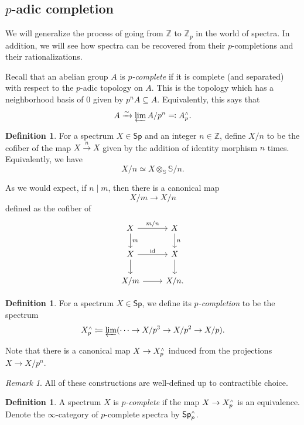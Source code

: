 \documentclass[10pt, oneside]{memoir}
\theoremstyle{definition}
\newtheorem{defn}[thm]{Definition}
\theoremstyle{remark}
\newtheorem{rmk}[thm]{Remark}
\theoremstyle{plain}
\theoremstyle{definition}
\theoremstyle{remark}
\newcommand{\Z}{\mathbb{Z}}
\newcommand{\bS}{\mathbb{S}}
\newcommand{\mr}[1]{\mathrm{#1}}
\newcommand{\ms}[1]{\mathsf{#1}}
\newcommand{\1}{\mathbf{1}}
\newcommand{\2}{\mathbf{2}}
\newcommand{\3}{\mathbf{3}}
\newcommand{\sw}{\mathsmaller{\wedge}}
\begin{document}
\subsection{\(p \)-adic completion}%
\label{sub:p-adic completion}

We will generalize the process of going from \(\Z \) to \(\Z_p \) in the world of spectra. In addition, we will see how spectra can be recovered from their \(p \)-completions and their rationalizations.

Recall that an abelian group \(A \) is \textit{\(p \)-complete} if it is complete (and separated) with respect to the \(p \)-adic topology on \(A \). This is the topology which has a neighborhood basis of \(0 \) given by \(p^n A \subseteq A \). Equivalently, this says that
\[ A \xrightarrow{\sim} \varprojlim A/p^n \eqqcolon A^{\sw}_p. \]

\begin{defn}
    For a spectrum \(X \in \ms{Sp} \) and an integer \(n \in \Z \), define \(X/n \) to be the cofiber of the map \(X \xrightarrow{n} X \) given by the addition of identity morphism \(n \) times. Equivalently, we have
    \[ X/n \simeq X \otimes_{\bS} \bS/n. \]
\end{defn}

As we would expect, if \(n \mid m \), then there is a canonical map
\[ X/m \to X/n \] defined as the cofiber of
\begin{equation*}
\begin{tikzcd}
    X \ar{d}{m} \ar{r}{m/n} & X \ar{d}{n} \\
    X \ar{r}{\mr{id}} \ar{d} & X \ar{d} \\
    X/m \ar{r} & X/n.
\end{tikzcd}
\end{equation*}

\begin{defn}
    For a spectrum \(X \in \ms{Sp} \), we define its \textit{\(p \)-completion} to be the spectrum
    \[ X_p^{\sw} \coloneqq \varprojlim (\cdots \to X/p^3 \to X/p^2 \to X/p). \]
\end{defn}
Note that there is a canonical map \(X \to X_p^{\sw} \) induced from the projections \(X \to X/p^n \).

\begin{rmk}
    All of these constructions are well-defined up to contractible choice.
\end{rmk}

\begin{defn}
    A spectrum \(X \) is \textit{\(p \)-complete} if the map \(X \to X_p^{\sw} \) is an equivalence. Denote the \(\infty \)-category of \(p \)-complete spectra by \(\ms{Sp}_p^{\sw} \).
\end{defn}
\end{document}
